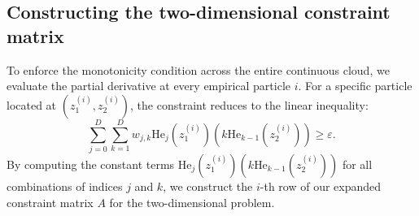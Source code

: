 \subsection{Constructing the two-dimensional constraint matrix}

To enforce the monotonicity condition across the entire continuous cloud, we evaluate the partial derivative at every empirical particle $i$. For a specific particle located at $(z_1^{(i)}, z_2^{(i)})$, the constraint reduces to the linear inequality:
\begin{equation*}
    \sum_{j=0}^D \sum_{k=1}^D w_{j,k} \text{He}_j(z_1^{(i)}) \left( k \text{He}_{k-1}(z_2^{(i)}) \right) \ge \varepsilon.
\end{equation*}
By computing the constant terms $\text{He}_j(z_1^{(i)}) (k \text{He}_{k-1}(z_2^{(i)}))$ for all combinations of indices $j$ and $k$, we construct the $i$-th row of our expanded constraint matrix ${A}$ for the two-dimensional problem.